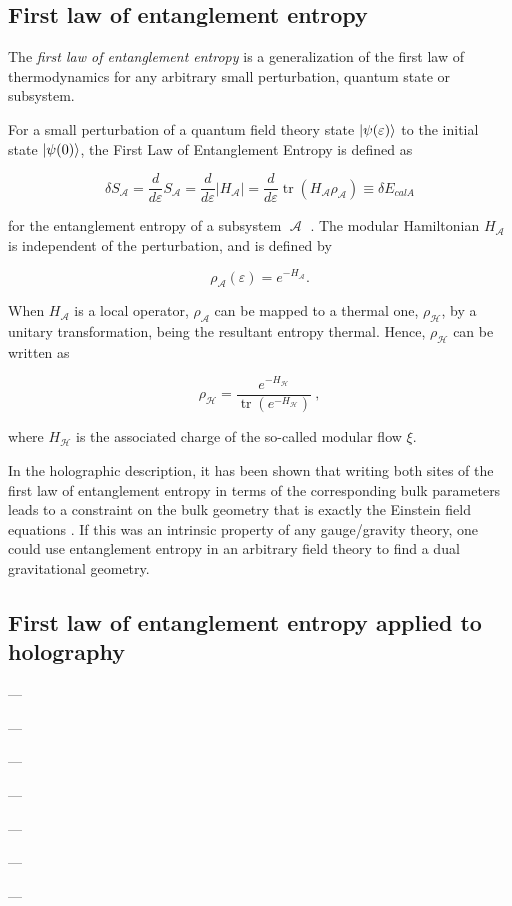 \documentclass[twocolumn]{revtex4}
\providecommand{\abs}[1]{\lvert#1\rvert}
\providecommand{\eq}[2]{
    \begin{equation}
        #2
    \label{eq:#1}
    \end{equation}
}
\DeclareMathOperator{\calA}{\mathcal{A}}
\DeclareMathOperator{\calH}{\mathcal{H}}
\DeclareMathOperator{\tr}{tr}
\begin{document}
\subsection{First law of entanglement entropy} \label{ss:FLEE}

The \textit{first law of entanglement entropy} is a generalization of the first law of thermodynamics for any arbitrary small perturbation, quantum state or subsystem.

For a small perturbation of a quantum field theory state $\ket{\psi(\varepsilon)}$ to the initial state $\ket{\psi(0)}$, the First Law of Entanglement Entropy is defined as
\eq{FLEE}{
    \delta S_{\calA} = \frac{d}{d \varepsilon} S_{\calA} = \frac{d}{d \varepsilon} \abs{H_{\calA}} = \frac{d}{d \varepsilon} \tr (H_{\calA} \rho_{\calA}) \equiv \delta E_{calA}
}
for the entanglement entropy of a subsystem $\calA$ \cite{fareghbal_first_2019}. The modular Hamiltonian $H_{\calA}$ is independent of the perturbation, and is defined by
\eq{modularH}{
    \rho_{\calA} (\varepsilon) = e^{-H_{\calA}}.
}

When $H_{\calA}$ is a local operator, $\rho_{\calA}$ can be mapped to a thermal one, $\rho_{\calH}$, by a unitary transformation, being the resultant entropy thermal. Hence, $\rho_{\calH}$ can be written as
\eq{modularH2}{
    \rho_{\calH} = \frac{e^{-H_{\calH}}}{\tr (e^{-H_{\calH}})} \ ,
}
where $H_{\calH}$ is the associated charge of the so-called modular flow $\xi$.

In the holographic description, it has been shown that writing both sites of the first law of entanglement entropy in terms of the corresponding bulk parameters leads to a constraint on the bulk geometry that is exactly the Einstein field equations \cite{fareghbal_first_2019}. If this was an intrinsic property of any gauge/gravity theory, one could use entanglement entropy in an arbitrary field theory to find a dual gravitational geometry.


\subsection{First law of entanglement entropy applied to holography} \label{ss:FLEE_H}

---

---

---

---

---

---

---
\end{document}
